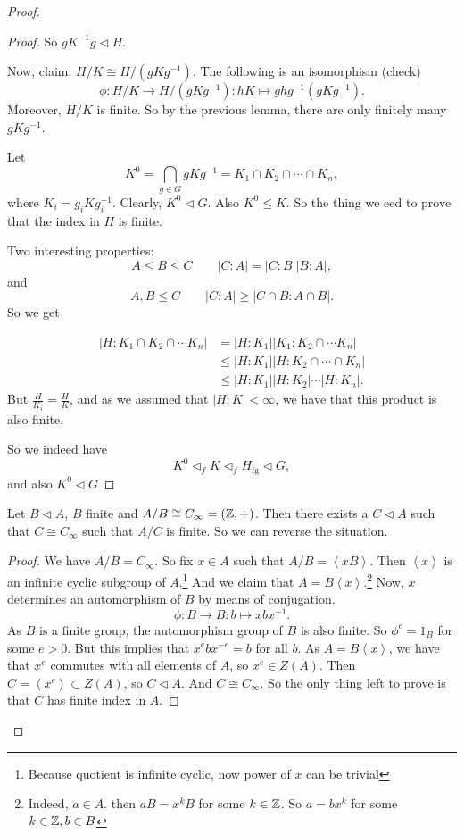 \begin{proof}
\begin{proof}
        So $g K^{-1} g \triangleleft H$.

        Now, claim: $H / K \cong H / (g K g^{-1})$. The following is an isomorphism (check)
        \[
            \phi: H / K \to  H / (g K g^{-1}) : hK \mapsto  g h g ^{-1}( g K g ^{-1})
        .\] 
        Moreover, $H / K$ is finite.
        So by the previous lemma, there are only finitely many $g K g^{-1}$.

        Let \[
        K^{0} = \bigcap_{g \in G} g K g^{-1} = K_1 \cap K_2 \cap  \cdots \cap  K_n,
    \]
    where $K_i = g_i K g_i^{-1}$.
    Clearly, $K^{0} \triangleleft G$.
    Also $K^{0} \le K$.
    So the thing we eed to prove that the index in $H$ is finite.

    Two interesting properties:
    \[
    A\le B\le C \qquad |C:A| = |C:B| |B:A|,
 \] 
 and
 \[
 A,B \le C \qquad |C:A| \ge  |C \cap B : A \cap B|
 .\] 
 So we get

    \begin{align*}
        |H : K_1 \cap K_2 \cap \cdots K_n| &= 
        |H : K_1 | |K_1: K_2 \cap \cdots K_n|\\
       &\le |H:K_1| |H : K_2 \cap \cdots \cap K_n|\\
       &\le |H:K_1| |H:K_2| \cdots |H :K_n|
    .\end{align*}
    But $\frac{H}{K_i} = \frac{H}{K}$, and as we assumed that $|H:K| < \infty$, we have that this product is also finite.

    So we indeed have
    \[
    K^{0} \triangleleft_f K \triangleleft _f H_\text{fg}  \triangleleft G
    ,\] 
    and also $K^{0} \triangleleft G$
    \end{proof}
    \begin{lemma}
        Let $B \triangleleft A$, $B$ finite and $A / B \cong C_{\infty} = (\mathbb{Z}, +)$.
        Then there exists a $C \triangleleft A$ such that $C \cong C_{\infty}$ such that $A / C$ is finite.
        So we can reverse the situation.
    \end{lemma}
    \begin{proof}
        We have $A / B = C_\infty$.
        So fix $x \in A$ such that $A / B = \left<x B \right>$.
        Then $\left<x \right>$ is an infinite cyclic subgroup of $A$.\footnote{Because quotient is infinite cyclic, now power of $x$ can be trivial}
        And we claim that $A = B \left<x \right>$.\footnote{Indeed, $a \in A$. then $a B = x^{k} B$ for some $k \in \mathbb{Z}$. So $a = b x^{k}$ for some $k \in \mathbb{Z}, b \in B$}
        Now, $x$ determines an automorphism of $B$ by means of conjugation.
        \[
        \phi: B \to  B: b \mapsto  x b x^{-1}
        .\] 
        As $B$ is a finite group, the automorphism group of $B$ is also finite.
        So $\phi^{e} = 1_B$ for some $e>0$. 
        But this implies that $x^{e} b x^{-e} = b$ for all $b$.
        As  $A = B \left<x \right>$, we have that 
        $x^{e}$ commutes with all elements of $A$, so $x^{e} \in Z(A)$.
        Then $C = \left<x^{e} \right> \subset Z(A)$, so $C \triangleleft A$.
        And $C \cong C_\infty$.
        So the only thing left to prove is that $C$ has finite index in $A$.


\end{proof}
\end{proof}
